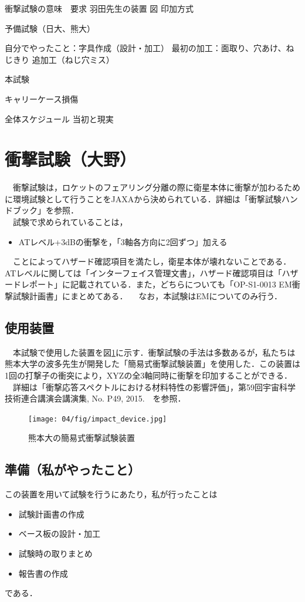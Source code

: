 衝撃試験の意味　要求
羽田先生の装置
図
印加方式


予備試験（日大、熊大）

自分でやったこと：字具作成（設計・加工） 
最初の加工：面取り、穴あけ、ねじきり
追加工（ねじ穴ミス）

本試験

キャリーケース損傷

全体スケジュール
当初と現実
\fi


\section{衝撃試験（大野）}
　衝撃試験は，ロケットのフェアリング分離の際に衛星本体に衝撃が加わるために環境試験として行うことをJAXAから決められている．詳細は「衝撃試験ハンドブック」を参照．\\
　試験で求められていることは，
\begin{itemize}
 \item ATレベル+3dBの衝撃を，「3軸各方向に2回ずつ」加える
\end{itemize}
　ことによってハザード確認項目を満たし，衛星本体が壊れないことである．ATレベルに関しては「インターフェイス管理文書」，ハザード確認項目は「ハザードレポート」に記載されている．また，どちらについても「OP-S1-0013 EM衝撃試験計画書」にまとめてある．
　なお，本試験はEMについてのみ行う．

\subsection{使用装置}
　本試験で使用した装置を図\ref{fig4-4-1}に示す．衝撃試験の手法は多数あるが，私たちは熊本大学の波多先生が開発した「簡易式衝撃試験装置」を使用した．この装置は1回の打撃子の衝突により，XYZの全3軸同時に衝撃を印加することができる．\\
　詳細は「衝撃応答スペクトルにおける材料特性の影響評価」，第59回宇宙科学技術連合講演会講演集, No. P49, 2015.　を参照．
\begin{figure}[H]
	\centering
	\texttt{[image: 04/fig/impact\_device.jpg]}
	\caption{熊本大の簡易式衝撃試験装置}
	\label{fig4-4-1}
\end{figure}
\subsection{準備（私がやったこと）}
この装置を用いて試験を行うにあたり，私が行ったことは
\begin{itemize}
 \item 試験計画書の作成
 \item ベース板の設計・加工
 \item 試験時の取りまとめ
 \item 報告書の作成
\end{itemize}
である．
